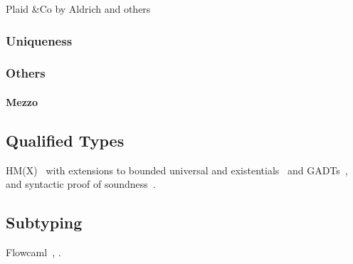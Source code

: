 Plaid \&Co by Aldrich and others

\subsubsection{Uniqueness}

\subsubsection{Others}

\paragraph{Mezzo}

\subsection{Qualified Types}

HM(X)~\citep{DBLP:journals/tapos/OderskySW99} with extensions to
bounded universal and existentials~\citep{DBLP:conf/icfp/Simonet03}
and GADTs~\citep{DBLP:journals/toplas/SimonetP07},
and syntactic proof of soundness~\citep{DBLP:journals/entcs/SkalkaP02}.

\subsection{Subtyping}



Flowcaml~\citep{DBLP:conf/popl/PottierS02},
\citet{DBLP:conf/sas/TrifonovS96}.


